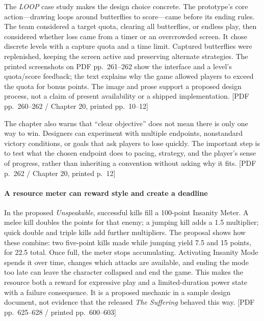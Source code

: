 The \emph{LOOP} case study makes the design choice concrete. The prototype's core action---drawing loops around butterflies to score---came before its ending rules. The team considered a target quota, clearing all butterflies, or endless play, then considered whether loss came from a timer or an overcrowded screen. It chose discrete levels with a capture quota and a time limit. Captured butterflies were replenished, keeping the screen active and preserving alternate strategies. The printed screenshots on PDF pp.~261--262 show the interface and a level's quota/score feedback; the text explains why the game allowed players to exceed the quota for bonus points. The image and prose support a proposed design process, not a claim of present availability or a shipped implementation. {[}PDF pp.~260--262 / Chapter 20, printed pp.~10--12{]}

The chapter also warns that ``clear objective'' does not mean there is only one way to win. Designers can experiment with multiple endpoints, nonstandard victory conditions, or goals that ask players to lose quickly. The important step is to test what the chosen endpoint does to pacing, strategy, and the player's sense of progress, rather than inheriting a convention without asking why it fits. {[}PDF p.~262 / Chapter 20, printed p.~12{]}

\paragraph{A resource meter can reward style and create a deadline}\label{05-engine-i-ch009-a-resource-meter-can-reward-style-and-create-a-deadline}

In the proposed \emph{Unspeakable}, successful kills fill a 100-point Insanity Meter. A melee kill doubles the points for that enemy; a jumping kill adds a 1.5 multiplier; quick double and triple kills add further multipliers. The proposal shows how these combine: two five-point kills made while jumping yield 7.5 and 15 points, for 22.5 total. Once full, the meter stops accumulating. Activating Insanity Mode spends it over time, changes which attacks are available, and ending the mode too late can leave the character collapsed and end the game. This makes the resource both a reward for expressive play and a limited-duration power state with a failure consequence. It is a proposed mechanic in a sample design document, not evidence that the released \emph{The Suffering} behaved this way. {[}PDF pp.~625--628 / printed pp.~600--603{]}

